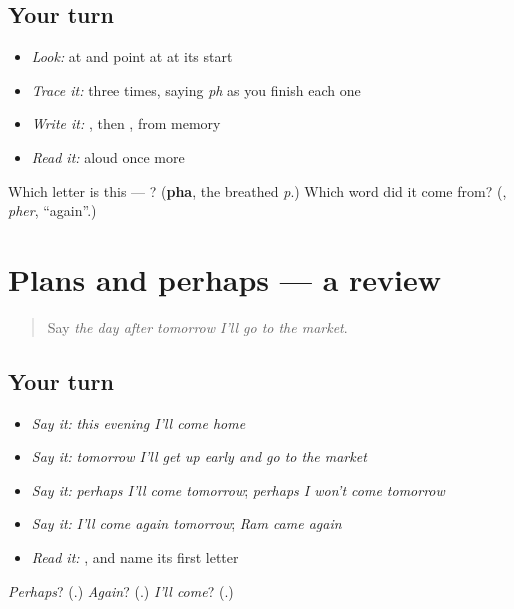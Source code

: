 \subsection*{Your turn}
\begin{itemize}
\raggedright
  \item \emph{Look:} at \textbf{} and point at  at its start
  \item \emph{Trace it:}  three times, saying \emph{ph} as you finish each one
  \item \emph{Write it:} , then , from memory
  \item \emph{Read it:} \textbf{} aloud once more
\end{itemize}

\begin{tcolorbox}[breakable,colback=teal!4,colframe=teal!35!black,title={Before you move on}]
Which letter is this — ? (\textbf{pha}, the breathed \emph{p}.) Which word did it come from? (\textbf{}, \emph{pher}, \textquotedblleft{}again\textquotedblright{}.)
\end{tcolorbox}
\section[(dialogue)]{Plans and perhaps — a review}

\label{lesson:MW-R163-plans}



\begin{quote}
Say \emph{the day after tomorrow I'll go to the market}.
\end{quote}

\subsection*{Your turn}
\begin{itemize}
\raggedright
  \item \emph{Say it:} \emph{this evening I'll come home}
  \item \emph{Say it:} \emph{tomorrow I'll get up early and go to the market}
  \item \emph{Say it:} \emph{perhaps I'll come tomorrow}; \emph{perhaps I won't come tomorrow}
  \item \emph{Say it:} \emph{I'll come again tomorrow}; \emph{Ram came again}
  \item \emph{Read it:} \textbf{}, and name its first letter
\end{itemize}

\begin{tcolorbox}[breakable,colback=teal!4,colframe=teal!35!black,title={Before you move on}]
\emph{Perhaps}? (\textbf{}.) \emph{Again}? (\textbf{}.) \emph{I'll come}? (\textbf{}.)
\end{tcolorbox}

